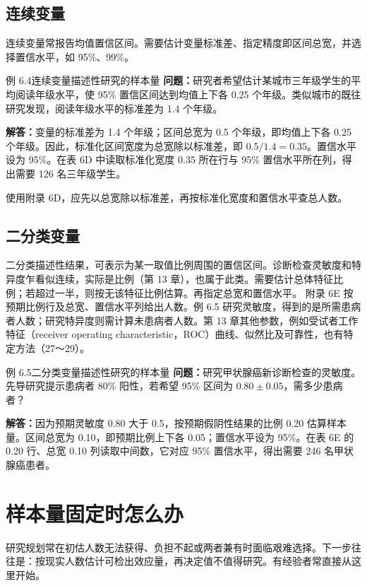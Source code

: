 \subsection{连续变量}
连续变量常报告均值置信区间。需要估计变量标准差、指定精度即区间总宽，并选择置信水平，如 95\%、99\%。
\begin{bookbox}{例 6.4\quad 连续变量描述性研究的样本量}
\textbf{问题：}研究者希望估计某城市三年级学生的平均阅读年级水平，使 95\% 置信区间达到均值上下各 $0.25$ 个年级。类似城市的既往研究发现，阅读年级水平的标准差为 1.4 个年级。

\textbf{解答：}变量的标准差为 1.4 个年级；区间总宽为 0.5 个年级，即均值上下各 0.25 个年级。因此，标准化区间宽度为总宽除以标准差，即 $0.5/1.4=0.35$。置信水平设为 95\%。在表 6D 中读取标准化宽度 0.35 所在行与 95\% 置信水平所在列，得出需要 126 名三年级学生。
\end{bookbox}
使用附录 6D，应先以总宽除以标准差，再按标准化宽度和置信水平查总人数。

\subsection{二分类变量}
二分类描述性结果，可表示为某一取值比例周围的置信区间。诊断检查灵敏度和特异度乍看似连续，实际是比例（第 13 章），也属于此类。需要估计总体特征比例；若超过一半，则按无该特征比例估算。再指定总宽和置信水平。
附录 6E 按预期比例行及总宽、置信水平列给出人数。例 6.5 研究灵敏度，得到的是所需患病者人数；研究特异度则需计算未患病者人数。第 13 章其他参数，例如受试者工作特征（receiver operating characteristic，ROC）曲线、似然比及可靠性，也有特定方法（27～29）。
\begin{bookbox}{例 6.5\quad 二分类变量描述性研究的样本量}
\textbf{问题：}研究甲状腺癌新诊断检查的灵敏度。先导研究提示患病者 80\% 阳性，若希望 95\% 区间为 $0.80\pm0.05$，需多少患病者？

\textbf{解答：}因为预期灵敏度 0.80 大于 0.5，按预期假阴性结果的比例 0.20 估算样本量。区间总宽为 0.10，即预期比例上下各 0.05；置信水平设为 95\%。在表 6E 的 0.20 行、总宽 0.10 列读取中间数，它对应 95\% 置信水平，得出需要 246 名甲状腺癌患者。
\end{bookbox}

\section{样本量固定时怎么办}
研究规划常在初估人数无法获得、负担不起或两者兼有时面临艰难选择。下一步往往是：按现实人数估计可检出效应量，再决定值不值得研究。有经验者常直接从这里开始。

